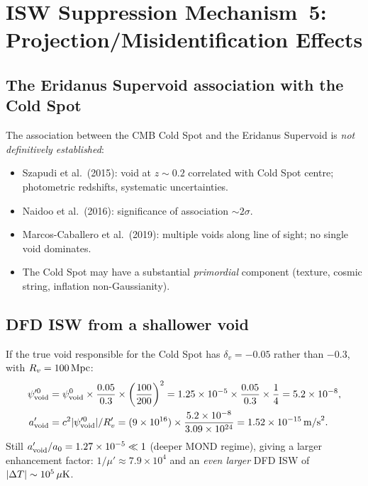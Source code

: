 \documentclass[11pt]{article}
\newcommand{\ee}[1]{\times 10^{#1}}
\newcommand{\mufd}{\mu}
\newcommand{\deltaT}{\Delta T}
\begin{document}
\section{ISW Suppression Mechanism~5: Projection/Misidentification Effects}
\label{sec:mechanism5-projection}

\subsection{The Eridanus Supervoid association with the Cold Spot}

The association between the CMB Cold Spot and the Eridanus Supervoid
is \emph{not definitively established}:
\begin{itemize}[nosep]
  \item Szapudi et al.\ (2015): void at $z \sim 0.2$ correlated with
    Cold Spot centre; photometric redshifts, systematic uncertainties.
  \item Naidoo et al.\ (2016): significance of association $\sim 2\sigma$.
  \item Marcos-Caballero et al.\ (2019): multiple voids along line of sight;
    no single void dominates.
  \item The Cold Spot may have a substantial \emph{primordial} component
    (texture, cosmic string, inflation non-Gaussianity).
\end{itemize}

\subsection{DFD ISW from a shallower void}

If the true void responsible for the Cold Spot has $\delta_v = -0.05$
rather than $-0.3$, with $R_v = 100\,{\rm Mpc}$:
\begin{align}
  \psi_{\rm void}^{\prime 0} &= \psi_{\rm void}^0
  \times\frac{0.05}{0.3}\times\left(\frac{100}{200}\right)^2
  = 1.25\ee{-5}\times\frac{0.05}{0.3}\times\frac{1}{4}
  = 5.2\ee{-8}, \\
  a_{\rm void}^\prime &= c^2|\psi_{\rm void}^{\prime 0}|/R_v^\prime
  = (9\ee{16})\times\frac{5.2\ee{-8}}{3.09\ee{24}}
  = 1.52\ee{-15}\,{\rm m/s}^2.
\end{align}
Still $a_{\rm void}^\prime/a_0 = 1.27\ee{-5} \ll 1$ (deeper MOND regime),
giving a larger enhancement factor: $1/\mufd' \approx 7.9\ee{4}$ and
an \emph{even larger} DFD ISW of $|\deltaT| \sim 10^5\,\mu{\rm K}$.
\end{document}
